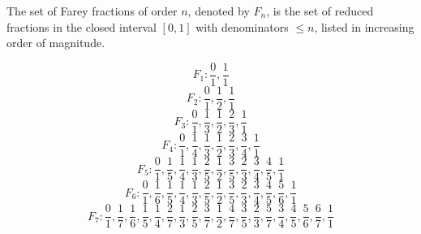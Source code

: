The set of Farey fractions of order $n$, denoted by $F_n$, is the set of reduced fractions in the closed interval $[0, 1]$ with denominators $\leq n$, listed in increasing order of magnitude.

$$F_1: \frac{0}{1}, \frac{1}{1}$$
$$F_2: \frac{0}{1}, \frac{1}{2}, \frac{1}{1}$$
$$F_3: \frac{0}{1}, \frac{1}{3}, \frac{1}{2}, \frac{2}{3}, \frac{1}{1}$$
$$F_4: \frac{0}{1}, \frac{1}{4}, \frac{1}{3}, \frac{1}{2}, \frac{2}{3}, \frac{3}{4}, \frac{1}{1}$$
$$F_5: \frac{0}{1}, \frac{1}{5}, \frac{1}{4}, \frac{1}{3}, \frac{2}{5}, \frac{1}{2}, \frac{3}{5}, \frac{2}{3}, \frac{3}{4}, \frac{4}{5}, \frac{1}{1}$$
$$F_6: \frac{0}{1}, \frac{1}{6}, \frac{1}{5}, \frac{1}{4}, \frac{1}{3}, \frac{2}{5}, \frac{1}{2}, \frac{3}{5}, \frac{2}{3}, \frac{3}{4}, \frac{4}{5}, \frac{5}{6}, \frac{1}{1}$$
$$F_7: \frac{0}{1}, \frac{1}{7}, \frac{1}{6}, \frac{1}{5}, \frac{1}{4}, \frac{2}{7}, \frac{1}{3}, \frac{2}{5}, \frac{3}{7}, \frac{1}{2}, \frac{4}{7}, \frac{3}{5}, \frac{2}{3}, \frac{5}{7}, \frac{3}{4}, \frac{4}{5}, \frac{5}{6}, \frac{6}{7}, \frac{1}{1}$$
